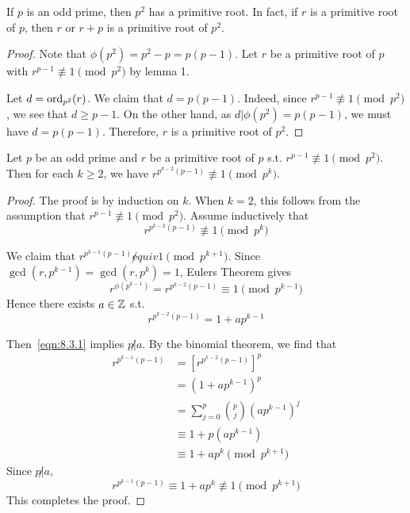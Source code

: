 \begin{corollary}
    If $p$ is an odd prime, then $p^2$ has a primitive root.
    In fact, if $r$ is a primitive root of $p$, then $r$ or 
    $r + p$ is a primitive root of $p^2$.
\end{corollary}
\begin{proof}
    Note that $\phi(p^2) = p^2 - p = p(p-1)$.
    Let $r$ be a primitive root of $p$ with $r^{p-1} \not\equiv 1 \pmod {p^2}$ by lemma 1.

    Let $d = \text{ord}_{p^2}(r)$. 
    We claim that $d = p(p-1)$.
    Indeed, since $r^{p-1} \not \equiv 1 \pmod {p^2}$, we see that $d \geq p-1$.
    On the other hand, as $d | \phi(p^2) = p(p-1)$, we must have $d = p(p-1)$.
    Therefore, $r$ is a primitive root of $p^2$.
\end{proof}

\begin{lemma}
    Let $p$ be an odd prime and $r$ be a primitive root of $p$ s.t. $r^{p-1} \not\equiv 1 \pmod {p^2}$.
    Then for each $k \geq 2$, we have $r^{p^{k-2}(p-1)} \not\equiv 1 \pmod{p^k}$.
\end{lemma}
\begin{proof}
    The proof is by induction on $k$. When $k = 2$, this follows from the assumption that
    $r^{p-1} \not\equiv 1 \pmod {p^2}$.
    Assume inductively that 
    \[  
        \tag{*}
        r^{p^{k-2}(p-1)} \not\equiv 1 \pmod {p^k}
        \label{eqn:8.3.1}
    \]

    We claim that $r^{p^{k-1}(p-1)} \not equiv 1 \pmod {p^{k+1}}$.
    Since $\gcd(r, p^{k-1}) = \gcd(r, p^k) = 1$,
    Eulers Theorem gives
    \[
        r^{\phi(p^{k-1})} = r^{p^{k-2}(p-1)} \equiv 1 \pmod p^{k-1}
    \]
    Hence there exists $a \in \mathbb{Z}$ s.t.
    \[
        r^{p^{k-2}(p-1)} = 1 + ap^{k-1}
    \]

    Then~\eqref{eqn:8.3.1} implies $p \not| a$. By the binomial theorem, we find that
    \[
        \begin{aligned}
            r^{p^{k-1}(p-1)} &= {[r^{p^{k-2}(p-1)}]}^p \\
            &= {(1 + ap^{k-1})}^p \\
            &= \sum_{j=0}^{p}{p \choose j}{(ap^{k-1})}^j \\
            &\equiv 1 + p (ap^{k-1}) \\
            &\equiv 1 + ap^k \pmod p^{k+1}
        \end{aligned}
    \]
    Since $p \not| a$, 
    \[
        r^{p^{k-1}(p-1)} \equiv 1 + ap^k \not\equiv 1 \pmod p^{k+1}
    \]
    This completes the proof.
\end{proof}

